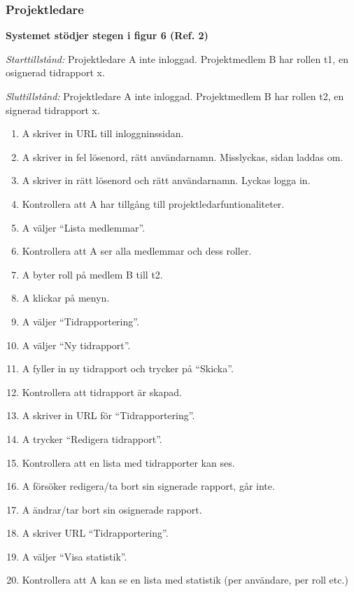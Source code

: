 \documentclass[a4paper]{article}
\begin{document}
\subsubsection{Projektledare}

\begin{ST}
\item 
\textbf{Systemet stödjer stegen i figur 6 (Ref. 2)}

\emph{Starttillstånd:} Projektledare A inte inloggad. Projektmedlem B har rollen t1, en osignerad tidrapport x.

\emph{Sluttillstånd:} Projektledare A inte inloggad. Projektmedlem B har rollen t2, en signerad tidrapport x.

\begin{enumerate}

\item A skriver in URL till inloggninssidan.
\item A skriver in fel lösenord, rätt användarnamn. Misslyckas, sidan laddas om.
\item A skriver in rätt lösenord och rätt användarnamn. Lyckas logga in.
\item Kontrollera att A har tillgång till projektledarfuntionaliteter.
\item A väljer ``Lista medlemmar''.
\item Kontrollera att A ser alla medlemmar och dess roller.
\item A byter roll på medlem B till t2.
\item A klickar på menyn.
\item A väljer ``Tidrapportering''.
\item A väljer ``Ny tidrapport''.
\item A fyller in ny tidrapport och trycker på ``Skicka''.
\item Kontrollera att tidrapport är skapad.
\item A skriver in URL för ``Tidrapportering''.
\item A trycker ``Redigera tidrapport''.
\item Kontrollera att en lista med tidrapporter kan ses.
\item A försöker redigera/ta bort sin signerade rapport, går inte.
\item A ändrar/tar bort sin osignerade rapport.
\item A skriver URL ``Tidrapportering''.
\item A väljer ``Visa statistik''.
\item Kontrollera att A kan se en lista med statistik (per användare, per roll etc.)

\end{enumerate}
\end{ST}
\end{document}
